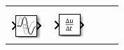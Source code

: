 \documentclass[margin=normal]{tex/hsrzf}
\begin{document}
\begin{tabular}{|c|c|c|c|c|}
      \textbf{}                                                                &
      \textbf{}                                                                &
      \textbf{}                                                                  \\
      \includegraphics[]{img/matlab/transport_delay_block_icon.png} &
      \includegraphics[]{img/matlab/derivative_block_icon.png}      &
      \\
      \hline
\end{tabular}
\end{document}
